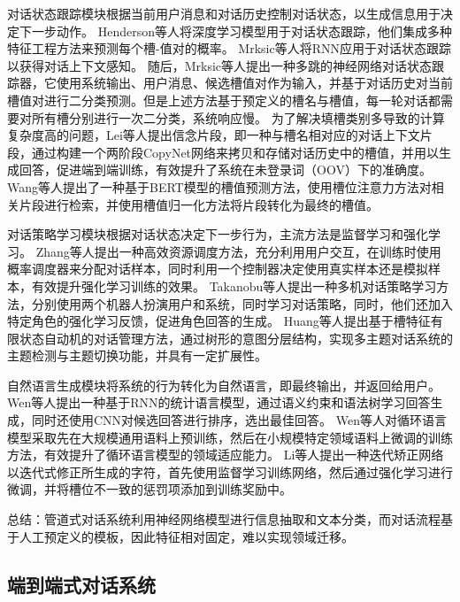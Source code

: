 对话状态跟踪模块根据当前用户消息和对话历史控制对话状态，以生成信息用于决定下一步动作。
Henderson等人\cite{DBLP:conf/sigdial/HendersonTY13}将深度学习模型用于对话状态跟踪，他们集成多种特征工程方法来预测每个槽-值对的概率。
Mrksic等人\cite{DBLP:conf/acl/MrksicSTGSVWY15}将RNN应用于对话状态跟踪以获得对话上下文感知。
随后，Mrksic等人\cite{DBLP:conf/acl/MrksicSWTY17}提出一种多跳的神经网络对话状态跟踪器，它使用系统输出、用户消息、候选槽值对作为输入，并基于对话历史对当前槽值对进行二分类预测。但是上述方法基于预定义的槽名与槽值，每一轮对话都需要对所有槽分别进行一次二分类，系统响应慢。
为了解决填槽类别多导致的计算复杂度高的问题，Lei等人\cite{DBLP:conf/acl/KanHLJRY18}提出信念片段，即一种与槽名相对应的对话上下文片段，通过构建一个两阶段CopyNet网络来拷贝和存储对话历史中的槽值，并用以生成回答，促进端到端训练，有效提升了系统在未登录词（OOV）下的准确度。
Wang等人\cite{DBLP:conf/emnlp/WangGZ20}提出了一种基于BERT模型的槽值预测方法，使用槽位注意力方法对相关片段进行检索，并使用槽值归一化方法将片段转化为最终的槽值。

对话策略学习模块根据对话状态决定下一步行为，主流方法是监督学习和强化学习。
Zhang等人\cite{DBLP:conf/acl/ZhangLGC19}提出一种高效资源调度方法，充分利用用户交互，在训练时使用概率调度器来分配对话样本，同时利用一个控制器决定使用真实样本还是模拟样本，有效提升强化学习训练的效果。
Takanobu等人\cite{DBLP:conf/acl/TakanobuLH20}提出一种多机对话策略学习方法，分别使用两个机器人扮演用户和系统，同时学习对话策略，同时，他们还加入特定角色的强化学习反馈，促进角色回答的生成。
Huang等人\cite{JSJX200408010}提出基于槽特征有限状态自动机的对话管理方法，通过树形的意图分层结构，实现多主题对话系统的主题检测与主题切换功能，并具有一定扩展性。

自然语言生成模块将系统的行为转化为自然语言，即最终输出，并返回给用户。
Wen等人\cite{DBLP:conf/sigdial/WenGKMSVY15}提出一种基于RNN的统计语言模型，通过语义约束和语法树学习回答生成，同时还使用CNN对候选回答进行排序，选出最佳回答。
Wen等人\cite{DBLP:conf/naacl/WenGMRSVY16}对循环语言模型采取先在大规模通用语料上预训练，然后在小规模特定领域语料上微调的训练方法，有效提升了循环语言模型的领域适应能力。
Li等人\cite{DBLP:conf/acl/LiYQCLL20}提出一种迭代矫正网络以迭代式修正所生成的字符，首先使用监督学习训练网络，然后通过强化学习进行微调，并将槽位不一致的惩罚项添加到训练奖励中。

总结：管道式对话系统利用神经网络模型进行信息抽取和文本分类，而对话流程基于人工预定义的模板，因此特征相对固定，难以实现领域迁移。

\subsection{端到端式对话系统}

